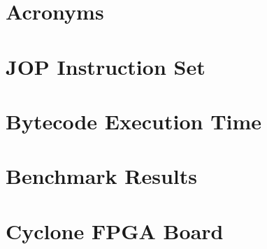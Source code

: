 \chapter{Acronyms}
 \label{appx:acro}



\chapter{JOP Instruction Set} \label{appx:jop:instr}


\chapter{Bytecode Execution Time} \label{appx:bytecode}


\chapter{Benchmark Results} \label{appx:bench}


\chapter{Cyclone FPGA Board} \label{appx:cycore}




%



